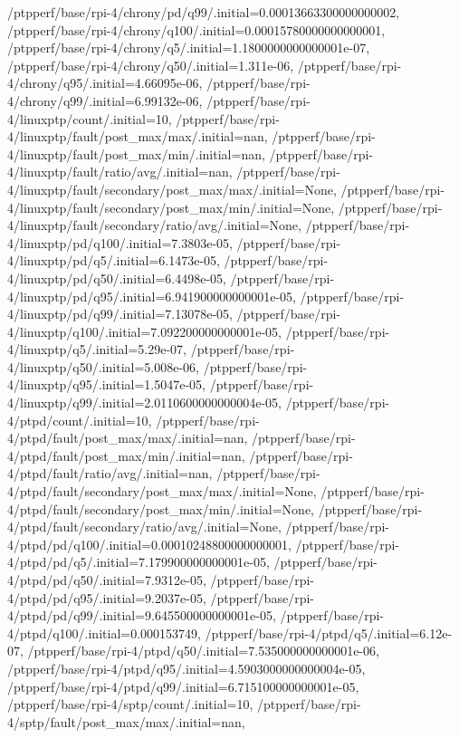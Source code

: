 {    /ptpperf/base/rpi-4/chrony/pd/q99/.initial=0.00013663300000000002,
    /ptpperf/base/rpi-4/chrony/q100/.initial=0.00015780000000000001,
    /ptpperf/base/rpi-4/chrony/q5/.initial=1.1800000000000001e-07,
    /ptpperf/base/rpi-4/chrony/q50/.initial=1.311e-06,
    /ptpperf/base/rpi-4/chrony/q95/.initial=4.66095e-06,
    /ptpperf/base/rpi-4/chrony/q99/.initial=6.99132e-06,
    /ptpperf/base/rpi-4/linuxptp/count/.initial=10,
    /ptpperf/base/rpi-4/linuxptp/fault/post_max/max/.initial=nan,
    /ptpperf/base/rpi-4/linuxptp/fault/post_max/min/.initial=nan,
    /ptpperf/base/rpi-4/linuxptp/fault/ratio/avg/.initial=nan,
    /ptpperf/base/rpi-4/linuxptp/fault/secondary/post_max/max/.initial=None,
    /ptpperf/base/rpi-4/linuxptp/fault/secondary/post_max/min/.initial=None,
    /ptpperf/base/rpi-4/linuxptp/fault/secondary/ratio/avg/.initial=None,
    /ptpperf/base/rpi-4/linuxptp/pd/q100/.initial=7.3803e-05,
    /ptpperf/base/rpi-4/linuxptp/pd/q5/.initial=6.1473e-05,
    /ptpperf/base/rpi-4/linuxptp/pd/q50/.initial=6.4498e-05,
    /ptpperf/base/rpi-4/linuxptp/pd/q95/.initial=6.941900000000001e-05,
    /ptpperf/base/rpi-4/linuxptp/pd/q99/.initial=7.13078e-05,
    /ptpperf/base/rpi-4/linuxptp/q100/.initial=7.092200000000001e-05,
    /ptpperf/base/rpi-4/linuxptp/q5/.initial=5.29e-07,
    /ptpperf/base/rpi-4/linuxptp/q50/.initial=5.008e-06,
    /ptpperf/base/rpi-4/linuxptp/q95/.initial=1.5047e-05,
    /ptpperf/base/rpi-4/linuxptp/q99/.initial=2.0110600000000004e-05,
    /ptpperf/base/rpi-4/ptpd/count/.initial=10,
    /ptpperf/base/rpi-4/ptpd/fault/post_max/max/.initial=nan,
    /ptpperf/base/rpi-4/ptpd/fault/post_max/min/.initial=nan,
    /ptpperf/base/rpi-4/ptpd/fault/ratio/avg/.initial=nan,
    /ptpperf/base/rpi-4/ptpd/fault/secondary/post_max/max/.initial=None,
    /ptpperf/base/rpi-4/ptpd/fault/secondary/post_max/min/.initial=None,
    /ptpperf/base/rpi-4/ptpd/fault/secondary/ratio/avg/.initial=None,
    /ptpperf/base/rpi-4/ptpd/pd/q100/.initial=0.00010248800000000001,
    /ptpperf/base/rpi-4/ptpd/pd/q5/.initial=7.179900000000001e-05,
    /ptpperf/base/rpi-4/ptpd/pd/q50/.initial=7.9312e-05,
    /ptpperf/base/rpi-4/ptpd/pd/q95/.initial=9.2037e-05,
    /ptpperf/base/rpi-4/ptpd/pd/q99/.initial=9.645500000000001e-05,
    /ptpperf/base/rpi-4/ptpd/q100/.initial=0.000153749,
    /ptpperf/base/rpi-4/ptpd/q5/.initial=6.12e-07,
    /ptpperf/base/rpi-4/ptpd/q50/.initial=7.535000000000001e-06,
    /ptpperf/base/rpi-4/ptpd/q95/.initial=4.5903000000000004e-05,
    /ptpperf/base/rpi-4/ptpd/q99/.initial=6.715100000000001e-05,
    /ptpperf/base/rpi-4/sptp/count/.initial=10,
    /ptpperf/base/rpi-4/sptp/fault/post_max/max/.initial=nan,
}
